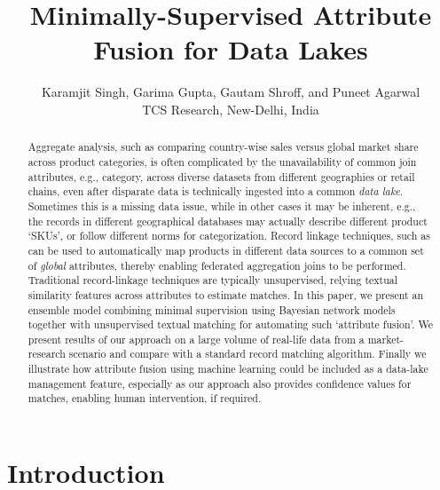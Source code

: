 \documentclass[a4page,10pt]{article}
\title{Minimally-Supervised Attribute Fusion for Data Lakes}
\begin{document}
\author{Karamjit Singh, Garima Gupta, Gautam Shroff, and Puneet Agarwal
%
%
\vspace{.3cm}\\
%
TCS Research, New-Delhi, India\\
%
}
\maketitle 


\begin{abstract}
Aggregate analysis, such as comparing country-wise sales versus global market share across product categories, is often complicated by the unavailability of common join attributes, e.g., category, across diverse datasets from different geographies
or retail chains, even after disparate data is technically ingested into a common \textit{data lake}.
Sometimes this is a missing data issue, while in other cases it may be inherent, e.g., the records in different 
geographical databases may actually describe different product `SKUs', or follow different norms
for categorization. Record linkage techniques, such as \cite{christen2008febrl} can be used to automatically map products in different data sources
to a common set of \textit{global} attributes, thereby enabling federated aggregation joins to be performed.
Traditional record-linkage techniques are typically unsupervised, relying textual similarity features across attributes
to estimate matches. In this paper, we present an ensemble model combining minimal supervision using Bayesian network
models together with unsupervised textual matching for automating such `attribute fusion'. We present results of our approach 
on a large volume of real-life data from a market-research scenario and compare with a standard record matching algorithm. 
Finally we illustrate how attribute fusion using machine 
learning could be included as a data-lake management feature, especially as our approach also
provides confidence values for matches, enabling human intervention, if required.
\end{abstract}


\section{Introduction}
\label{sec:intro}
\end{document}
